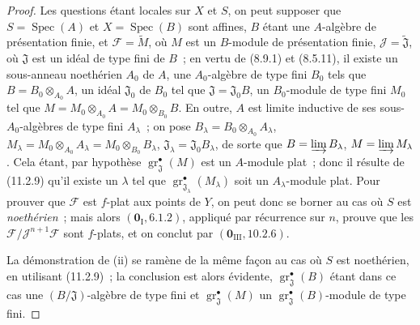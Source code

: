 \begin{proof}
Les questions étant locales sur $X$ et $S$, on peut supposer que
$S=\operatorname{Spec}(A)$ et $X=\operatorname{Spec}(B)$ sont affines, $B$ étant
une $A$-algèbre de présentation finie, et $\mathcal F=\widetilde M$, où $M$ est
un $B$-module de présentation finie, $\mathcal J=\widetilde{\mathfrak J}$, où
$\mathfrak J$ est un idéal de type fini de $B$~; en vertu de (8.9.1) et
(8.5.11), il existe un sous-anneau noethérien $A_0$ de $A$, une $A_0$-algèbre
de type fini $B_0$ tels que $B=B_0\otimes_{A_0}A$, un idéal $\mathfrak J_0$ de
$B_0$ tel que $\mathfrak J=\mathfrak J_0B$, un $B_0$-module de type fini $M_0$
tel que $M=M_0\otimes_{A_0}A=M_0\otimes_{B_0}B$. En outre, $A$ est limite
inductive de ses sous-$A_0$-algèbres de type fini $A_\lambda$~; on pose
$B_\lambda=B_0\otimes_{A_0}A_\lambda$,
$M_\lambda=M_0\otimes_{A_0}A_\lambda=M_0\otimes_{B_0}B_\lambda$,
$\mathfrak J_\lambda=\mathfrak J_0B_\lambda$, de sorte que
$B=\varinjlim B_\lambda$, $M=\varinjlim M_\lambda$. Cela étant, par hypothèse
$\operatorname{gr}_{\mathfrak J}^\bullet(M)$ est un $A$-module plat~; donc il résulte
de (11.2.9) qu'il existe un $\lambda$ tel que
$\operatorname{gr}_{\mathfrak J_\lambda}^\bullet(M_\lambda)$ soit un
$A_\lambda$-module plat. Pour prouver que $\mathcal F$ est $f$-plat aux points
de $Y$, on peut donc se borner au cas où $S$ est \emph{noethérien}~; mais alors
$(\mathbf 0_{\mathrm I},6.1.2)$, appliqué par récurrence sur $n$, prouve que les
$\mathcal F/\mathcal J^{n+1}\mathcal F$ sont $f$-plats, et on conclut par
$(\mathbf 0_{\mathrm{III}},10.2.6)$.

La démonstration de (ii) se ramène de la même façon au cas où $S$ est
noethérien,
en utilisant (11.2.9)~; la conclusion est alors évidente,
$\operatorname{gr}_{\mathfrak J}^\bullet(B)$ étant dans ce cas une
$(B/\mathfrak J)$-algèbre de type fini et
$\operatorname{gr}_{\mathfrak J}^\bullet(M)$ un
$\operatorname{gr}_{\mathfrak J}^\bullet(B)$-module de type fini.


\end{proof}
